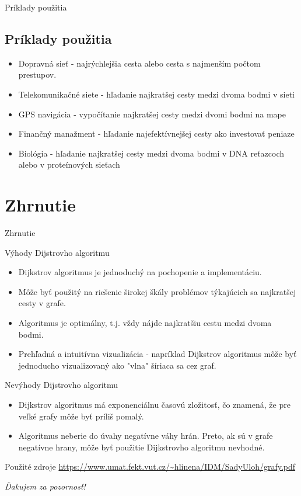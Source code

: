 \documentclass[15pt]{beamer}
\begin{document}
\begin{frame}{Príklady použitia}
	\subsection{Príklady použitia}
	\begin{itemize}
		\item Dopravná sieť - najrýchlejšia cesta alebo cesta s najmenším počtom prestupov.
		\item Telekomunikačné siete - hľadanie najkratšej cesty medzi dvoma bodmi v sieti
		\item GPS navigácia - vypočítanie najkratšej cesty medzi dvomi bodmi na mape
		\item Finančný manažment - hľadanie najefektívnejšej cesty ako investovať peniaze
		\item Biológia - hľadanie najkratšej cesty medzi dvoma bodmi v DNA reťazcoch alebo v proteínových sieťach
	\end{itemize}
\end{frame}

\section{Zhrnutie}
\begin{frame}{Zhrnutie}
		
	\begin{block}{Výhody Dijstrovho algoritmu}
		\begin{itemize}
			\item Dijkstrov algoritmus je jednoduchý na pochopenie a implementáciu.
			\item Môže byť použitý na riešenie širokej škály problémov týkajúcich sa najkratšej cesty v grafe.
			\item Algoritmus je optimálny, t.j. vždy nájde najkratšiu cestu medzi dvoma bodmi.
			\item Prehľadná a intuitívna vizualizácia - napríklad Dijkstrov algoritmus môže byť jednoducho vizualizovaný ako "vlna" šíriaca sa cez graf.
		\end{itemize}
	\end{block}
		
	\begin{block}{Nevýhody Dijstrovho algoritmu}
		\begin{itemize}
			\item Dijkstrov algoritmus má exponenciálnu časovú zložitosť, čo znamená, že pre veľké grafy môže byť príliš pomalý.
			\item Algoritmus neberie do úvahy negatívne váhy hrán. Preto, ak sú v grafe negatívne hrany, môže byť použitie Dijkstrovho algoritmu nevhodné.
		\end{itemize}
	\end{block}
\end{frame}

\begin{frame}{Použité zdroje}
	\url{https://www.umat.fekt.vut.cz/~hlinena/IDM/SadyUloh/grafy.pdf}
\end{frame}

\begin{frame}{}
	\centering \Huge \emph{Ďakujem za pozornosť!}
\end{frame}
\end{document}
